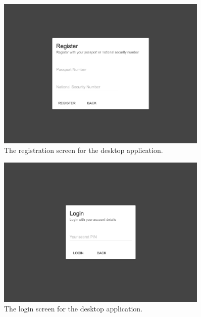 \documentclass{article}
\begin{document}
\begin{centering}
    \begin{figure}[H]
        \centering
        \includegraphics[width=0.9\textwidth]{screenshots/screen-register}
        \caption{The registration screen for the desktop application.}
        \label{fig:registration}
    \end{figure}
    
    \begin{figure}[H]
        \centering
        \includegraphics[width=0.9\textwidth]{screenshots/screen-login}
        \caption{The login screen for the desktop application.}
        \label{fig:registration}
    \end{figure}
    

\end{centering}
\end{document}
